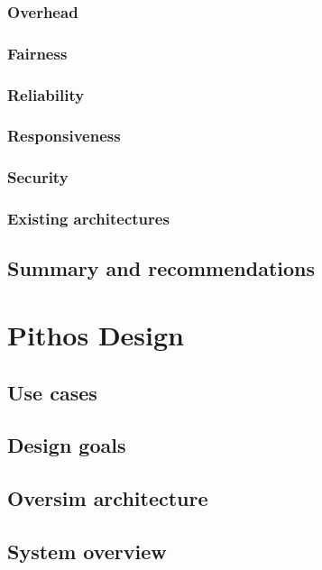         \subsection{Overhead}
        \subsection{Fairness}
        \subsection{Reliability}
        \subsection{Responsiveness}
        \subsection{Security}
        \subsection{Existing architectures}
    \section{Summary and recommendations}

\chapter{Pithos Design}
\label{chp:DESIGN}

    \section{Use cases}

    \section{Design goals}

    \section{Oversim architecture}

    \section{System overview}

